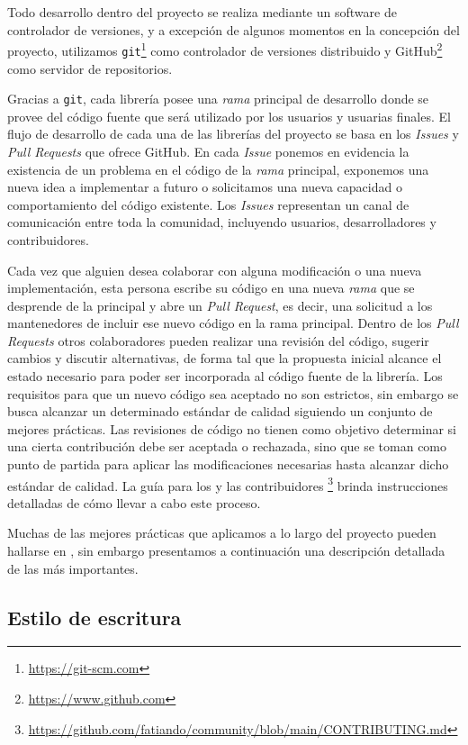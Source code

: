 Todo desarrollo dentro del proyecto se realiza mediante un software de
controlador de versiones, y a excepción de algunos momentos en la concepción
del proyecto, utilizamos \texttt{git}\footnote{\url{https://git-scm.com}} como
controlador de versiones distribuido
y GitHub\footnote{\url{https://www.github.com}} como servidor de repositorios.

Gracias a \texttt{git}, cada librería posee una \emph{rama} principal de
desarrollo donde se provee del código fuente que será utilizado por los
usuarios y usuarias finales.
El flujo de desarrollo de cada una de las librerías del proyecto se basa en los
\emph{Issues} y \emph{Pull Requests} que ofrece GitHub.
En cada \emph{Issue} ponemos en evidencia la existencia de un problema en el
código de la \emph{rama} principal, exponemos una nueva idea a implementar
a futuro o solicitamos una nueva capacidad o comportamiento del código
existente.
Los \emph{Issues} representan un canal de comunicación entre toda la comunidad,
incluyendo usuarios, desarrolladores y contribuidores.

Cada vez que alguien desea colaborar con alguna modificación o una nueva
implementación, esta persona escribe su código en una nueva \emph{rama} que
se desprende de la principal y abre un \emph{Pull Request}, es decir, una
solicitud a los mantenedores de incluir ese nuevo código en la rama principal.
Dentro de los \emph{Pull Requests} otros colaboradores pueden realizar una
revisión del código, sugerir cambios y discutir alternativas, de forma tal que
la propuesta inicial alcance el estado necesario para poder ser incorporada
al código fuente de la librería.
Los requisitos para que un nuevo código sea aceptado no son estrictos, sin
embargo se busca alcanzar un determinado estándar de calidad siguiendo un
conjunto de mejores prácticas.
Las revisiones de código no tienen como objetivo determinar si una cierta
contribución debe ser aceptada o rechazada, sino que se toman como punto de
partida para aplicar las modificaciones necesarias hasta alcanzar dicho
estándar de calidad.
La guía para los y las
contribuidores%
\footnote{
    \url{https://github.com/fatiando/community/blob/main/CONTRIBUTING.md}%
}
brinda instrucciones detalladas de cómo llevar a cabo este proceso.

Muchas de las mejores prácticas que aplicamos a lo largo del proyecto pueden
hallarse en \citet{wilson2014,wilson2017}, sin embargo presentamos
a continuación una descripción detallada de las más importantes.

\subsection{Estilo de escritura}

